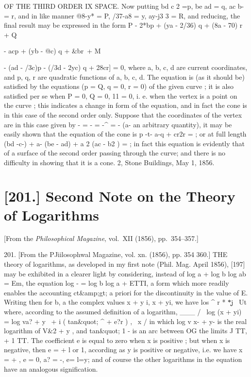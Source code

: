 \documentclass[11pt,a4paper]{book}
\begin{document}
OF THE THIRD ORDER IX SPACE.
Now putting
bd
c
2 =p,
be
ad = q,
ac
b- = r,
and
in
like manner
@8-y* = P,
/37-a8 = y,
ay-j3
3 = R,
and reducing, the
final
result may be expressed
in the form
P
{
- 2*bp + (ya - 2/36) q + (8a - 70) r}
+ Q
{
-
acp + (yb -
@c) q +
\&br\
+ M {- (ad - /3c)p - (/3d - 2yc) q +
28cr] = 0,
where
a,
b,
c, d are current
coordinates, and p,
q,
r are quadratic
functions
of
a,
b,
c,
d.
The
equation
is
(as
it
should
be)
satisfied by the equations (p = Q,
q = 0,
r = 0)
of
the
given
curve
;
it
is
also
satisfied per
se
when P = 0, Q = 0,
11 = 0,
i. e.
when the vertex
is
a
point
on
the
curve
;
this
indicates
a
change
in
form
of
the
equation,
and
in
fact
the
cone
is
in
this
case
of
the second order
only.
Suppose
that
the
coordinates
of
the
vertex
are
in
this
case
given
by
- = - = -^ =
-
(a-
an
arbitrary
quantity),
it
may be
easily shown
that the equation of the cone
is
p
-t- a-q + cr2r =
;
or at
full length
(bd -c-) + a- (be - ad) + a 2 (ac - b2
) =
;
in
fact
this
equation
is
evidently
that
of
a
surface
of
the
second
order
passing
through the curve;
and there
is no
difficulty
in showing that
it
is a
cone.
2, Stone Buildings, May
1,
1856.

\newpage

\section*{[201.] Second Note on the Theory of Logarithms}
\begin{center}
[From the \textit{Philosophical Magazine}, vol.~XII (1856), pp.~354--357.]
\end{center}


201.
[From the PJiilosophwal Magazine,
vol. xn.
(1856),
pp. 354
360.]
THE theory of logarithms, as developed in my
first note (Phil. Mag. April 1856), [197]
may be
exhibited in a clearer
light by considering, instead of log a + log b
log ab = Em,
the equation
log - = log b
log a + ETTI, a form which more
readily enables the accounting
ct\&amp;gt;
a
priori
for
the
discontinuity in
the
value
of E.
Writing
then
for
b, a the complex
values x + y i, x + yi, we have
los ^ r
*
\k
*j~ Ut
where, according
to the assumed
definition
of a
logarithm,
___
/
\
log (x + yi) = log va? + y~ + i
(
tan\&quot;
^ + e?r
)
,
\
x
/
in
which
log v x- + y-
is
the
real
logarithm
of V\&2 + y
, and
tan\&quot;
1 -
is an
arc between
OG
the
limits
J TT, + 1 TT.
The
coefficient
e
is
equal
to
zero
when
x
is
positive
;
but
when
x
is
negative,
then
e = + l
or
1, according as y
is
positive
or
negative,
i.e. we
have
x = +
,
e = 0,
a? = -,
e=
l=y;
and
of course the other logarithms
in the equation have an analogous
signification.

}}
\end{document}
